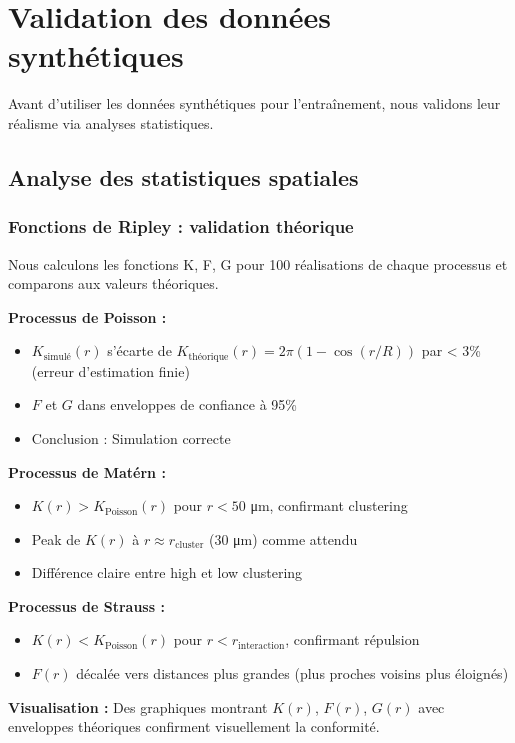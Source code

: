 \section{Validation des données synthétiques}

Avant d'utiliser les données synthétiques pour l'entraînement, nous validons leur réalisme via analyses statistiques.

\subsection{Analyse des statistiques spatiales}

\subsubsection{Fonctions de Ripley : validation théorique}

Nous calculons les fonctions K, F, G pour 100 réalisations de chaque processus et comparons aux valeurs théoriques.

\textbf{Processus de Poisson :}
\begin{itemize}
    \item $K_{\text{simulé}}(r)$ s'écarte de $K_{\text{théorique}}(r) = 2\pi(1-\cos(r/R))$ par < 3\% (erreur d'estimation finie)
    \item $F$ et $G$ dans enveloppes de confiance à 95\%
    \item Conclusion : Simulation correcte
\end{itemize}

\textbf{Processus de Matérn :}
\begin{itemize}
    \item $K(r) > K_{\text{Poisson}}(r)$ pour $r < 50$ μm, confirmant clustering
    \item Peak de $K(r)$ à $r \approx r_{\text{cluster}}$ (30 μm) comme attendu
    \item Différence claire entre high et low clustering
\end{itemize}

\textbf{Processus de Strauss :}
\begin{itemize}
    \item $K(r) < K_{\text{Poisson}}(r)$ pour $r < r_{\text{interaction}}$, confirmant répulsion
    \item $F(r)$ décalée vers distances plus grandes (plus proches voisins plus éloignés)
\end{itemize}

\textbf{Visualisation :}
Des graphiques montrant $K(r)$, $F(r)$, $G(r)$ avec enveloppes théoriques confirment visuellement la conformité.

